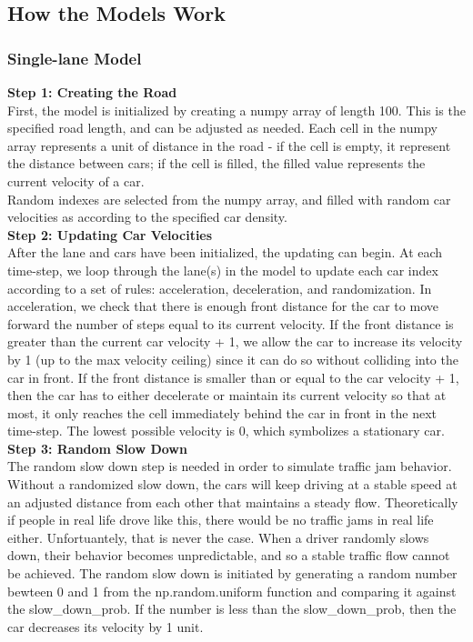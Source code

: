 \documentclass[11pt]{article}
\begin{document}
    \subsection{How the Models Work}

\subsubsection{Single-lane Model}

\textbf{Step 1: Creating the Road}\\

First, the model is initialized by creating a numpy array of length 100.
This is the specified road length, and can be adjusted as needed. Each
cell in the numpy array represents a unit of distance in the road - if
the cell is empty, it represent the distance between cars; if the cell
is filled, the filled value represents the current velocity of a car.\\

Random indexes are selected from the numpy array, and filled with random
car velocities as according to the specified car density.\\

\textbf{Step 2: Updating Car Velocities}\\

After the lane and cars have been initialized, the updating can begin.
At each time-step, we loop through the lane(s) in the model to update
each car index according to a set of rules: acceleration, deceleration,
and randomization. In acceleration, we check that there is enough front
distance for the car to move forward the number of steps equal to its
current velocity. If the front distance is greater than the current car
velocity + 1, we allow the car to increase its velocity by 1 (up to the
max velocity ceiling) since it can do so without colliding into the car
in front. If the front distance is smaller than or equal to the car
velocity + 1, then the car has to either decelerate or maintain its
current velocity so that at most, it only reaches the cell immediately
behind the car in front in the next time-step. The lowest possible
velocity is 0, which symbolizes a stationary car.\\

\textbf{Step 3: Random Slow Down}\\

The random slow down step is needed in order to simulate traffic jam
behavior. Without a randomized slow down, the cars will keep driving at
a stable speed at an adjusted distance from each other that maintains a
steady flow. Theoretically if people in real life drove like this, there
would be no traffic jams in real life either. Unfortuantely, that is
never the case. When a driver randomly slows down, their behavior
becomes unpredictable, and so a stable traffic flow cannot be achieved.
The random slow down is initiated by generating a random number bewteen
0 and 1 from the np.random.uniform function and comparing it against the
slow\_down\_prob. If the number is less than the slow\_down\_prob, then
the car decreases its velocity by 1 unit.\\
\end{document}
